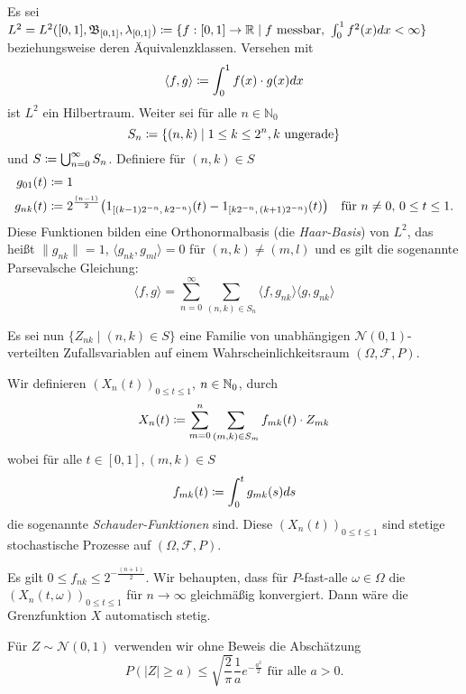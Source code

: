 \documentclass[a4paper,twoside,DIV15,BCOR12mm]{scrbook}
\newcommand{\cF}{\mathcal F}
\newcommand{\borel}{{\mathfrak B}}
\begin{document}
\begin{beweis}

Es sei $L^2=L^2([0,1],\borel_{[0,1]}, \lambda_{[0,1]}) \da \{f :[0,1]\to \MdR\mid f \text{ messbar, } \int_0^1 f^2(x)dx <\infty\}$ beziehungsweise deren Äquivalenzklassen. Versehen mit
\[
\langle f,g \rangle \da \int_0^1 f(x)\cdot g(x) dx
\]
ist $L^2$ ein Hilbertraum. Weiter sei für alle $n\in \mathbb N_0$
\[
S_n\da\{(n,k) \mid 1\le k \le 2^n, k\text{ ungerade}\}
\]
und $S\da\bigcup_{n=0}^\infty S_n$. Definiere für $(n,k)\in S$
\begin{align*}
g_{01}(t) &\da 1\\
g_{nk}(t) &\da 2^{\frac{(n-1)}2}\big( 1_{[(k-1)2^{-n},\,k2^{-n})}(t) - 1_{[k2^{-n},\,(k+1)2^{-n})}(t)\big) \quad \text{für } n\ne 0,\,0\le t\le 1.
\end{align*}
Diese Funktionen bilden eine Orthonormalbasis (die \emph{Haar-Basis}) von $L^2$, das heißt $\|g_{nk}\|=1$, $\langle g_{nk},g_{ml} \rangle = 0$ für $(n,k)\ne (m,l)$ und es gilt die sogenannte Parsevalsche Gleichung:
\[
\langle f,g\rangle = \sum_{n=0}^\infty \sum_{(n,k)\in S_n} \langle f,g_{nk}\rangle\langle g,g_{nk}\rangle
\]

Es sei nun $\{Z_{nk} \mid (n,k)\in S\}$ eine Familie von unabhängigen $\mathcal N(0,1)$-verteilten Zufallsvariablen auf einem Wahrscheinlichkeitsraum $(\Omega, \cF, P)$.

Wir definieren $(X_n(t))_{0\le t\le 1}$, $n\in \mathbb{N}_0$, durch
\begin{align*}
X_n(t) \da \sum_{m=0}^n \sum_{(m,k)\in S_m} f_{mk}(t) \cdot Z_{mk}
\end{align*}
wobei für alle $t\in[0,1], (m,k)\in S$
\begin{align*}
f_{mk}(t) \da \int_0^t g_{mk}(s) ds 
\end{align*}
die sogenannte \emph{Schauder-Funktionen} sind. Diese $(X_n(t))_{0\le t\le 1}$ sind stetige stochastische Prozesse auf $(\Omega,\cF, P)$.

Es gilt $0\le f_{nk} \le 2^{-\frac{(n+1)}2}$. Wir behaupten, dass für $P$-fast-alle $\omega\in \Omega$ die $(X_n(t,\omega))_{0\le t\le 1}$ für $n\to\infty$ gleichmäßig konvergiert. Dann wäre die Grenzfunktion $X$ automatisch stetig.

Für $Z\sim \mathcal N(0,1)$ verwenden wir ohne Beweis die Abschätzung
\[
P(|Z|\ge a) \le \sqrt {\frac2\pi}\frac 1a e^{-\frac{a^2}2}\text{ für alle }a>0.
\]


\end{beweis}
\end{document}
